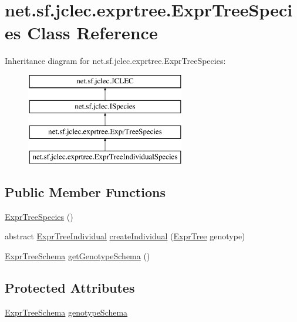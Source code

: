 \hypertarget{classnet_1_1sf_1_1jclec_1_1exprtree_1_1_expr_tree_species}{\section{net.\-sf.\-jclec.\-exprtree.\-Expr\-Tree\-Species Class Reference}
\label{classnet_1_1sf_1_1jclec_1_1exprtree_1_1_expr_tree_species}
}
Inheritance diagram for net.\-sf.\-jclec.\-exprtree.\-Expr\-Tree\-Species\-:\begin{figure}[H]
\begin{center}
\leavevmode
\includegraphics[height=4.000000cm]{classnet_1_1sf_1_1jclec_1_1exprtree_1_1_expr_tree_species}
\end{center}
\end{figure}
\subsection*{Public Member Functions}
\begin{DoxyCompactItemize}
\item 
\hyperlink{classnet_1_1sf_1_1jclec_1_1exprtree_1_1_expr_tree_species_a57756ad15f409b26fe51e27eaccf5905}{Expr\-Tree\-Species} ()
\item 
abstract \hyperlink{classnet_1_1sf_1_1jclec_1_1exprtree_1_1_expr_tree_individual}{Expr\-Tree\-Individual} \hyperlink{classnet_1_1sf_1_1jclec_1_1exprtree_1_1_expr_tree_species_afd641a58862d811f75a112b2dbdd9e0b}{create\-Individual} (\hyperlink{classnet_1_1sf_1_1jclec_1_1exprtree_1_1_expr_tree}{Expr\-Tree} genotype)
\item 
\hyperlink{classnet_1_1sf_1_1jclec_1_1exprtree_1_1_expr_tree_schema}{Expr\-Tree\-Schema} \hyperlink{classnet_1_1sf_1_1jclec_1_1exprtree_1_1_expr_tree_species_ae59c270bfe9783ffef96ae79fbcb0606}{get\-Genotype\-Schema} ()
\end{DoxyCompactItemize}
\subsection*{Protected Attributes}
\begin{DoxyCompactItemize}
\item 
\hyperlink{classnet_1_1sf_1_1jclec_1_1exprtree_1_1_expr_tree_schema}{Expr\-Tree\-Schema} \hyperlink{classnet_1_1sf_1_1jclec_1_1exprtree_1_1_expr_tree_species_aade758523efbdefd12889c858c7247a1}{genotype\-Schema}
\end{DoxyCompactItemize}


